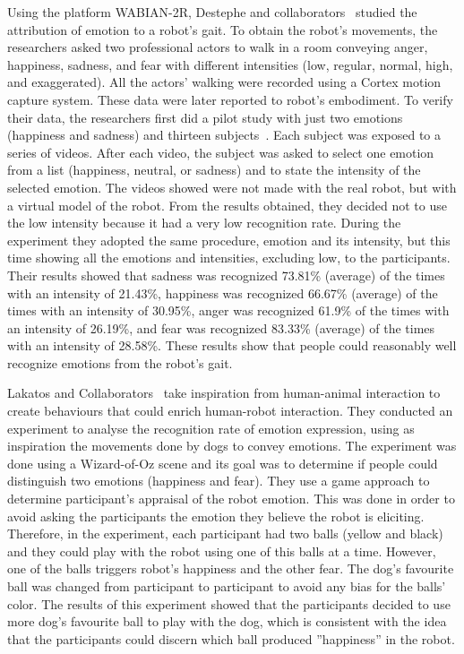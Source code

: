 Using the platform WABIAN-2R, Destephe and collaborators~\cite{Destephe2013b} studied the attribution of emotion to a robot's gait. To obtain the robot's movements, the researchers asked two professional actors to walk in a room conveying anger, happiness, sadness, and fear with different intensities (low, regular, normal, high, and exaggerated). All the actors' walking were recorded using a Cortex motion capture system. These data were later reported to robot's embodiment. To verify their data, the researchers first did a pilot study with just two emotions (happiness and sadness) and thirteen subjects~\cite{Destephe2013}. Each subject was exposed to a series of videos. After each video, the subject was asked to select one emotion from a list (happiness, neutral, or sadness) and to state the intensity of the selected emotion. The videos showed were not made with the real robot, but with a virtual model of the robot. From the results obtained, they decided not to use the low intensity because it had a very low recognition rate. During the experiment they adopted the same procedure, emotion and its intensity, but this time showing all the emotions and intensities, excluding low, to the participants. Their results showed that sadness was recognized 73.81\% (average) of the times with an intensity of 21.43\%, happiness was recognized 66.67\% (average) of the times with an intensity of 30.95\%, anger was recognized 61.9\% of the times with an intensity of 26.19\%, and fear was recognized 83.33\% (average) of the times with an intensity of 28.58\%. These results show that people could reasonably well recognize emotions from the robot's gait. 

Lakatos and Collaborators~\cite{Lakatos2014} take inspiration from human-animal interaction
to create behaviours that could enrich human-robot interaction. They conducted an experiment to analyse the recognition rate of emotion expression, using as inspiration the movements done by dogs to convey emotions. The experiment was done using a Wizard-of-Oz scene and its goal was to determine if people could distinguish two emotions (happiness and fear). They use a game approach to determine participant's appraisal of the robot emotion. This was done in order to avoid asking the participants the emotion they believe the robot is eliciting. Therefore, in the experiment, each participant had two balls (yellow and black) and they could play with the robot using one of this balls at a time. However, one of the balls triggers robot's happiness and the other fear. The dog's favourite ball was changed from participant to participant to avoid any bias for the balls' color. The results of this experiment showed that the participants decided to use more dog's favourite ball to play with the dog, which is consistent with the idea that the participants could discern which ball produced ''happiness'' in the robot.

